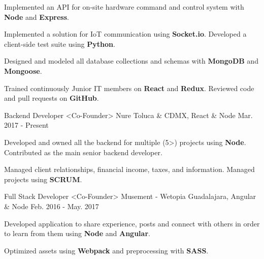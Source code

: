 \begin{cventries}
{\begin{cvitems}
        \item {Implemented an API for on-site hardware command and control system with \textbf{Node} and \textbf{Express}.}
        \item {Implemented a solution for IoT communication using \textbf{Socket.io}. Developed a client-side test suite using \textbf{Python}.}
        \item {Designed and modeled all database collections and schemas with \textbf{MongoDB} and \textbf{Mongoose}.}
        \item {Trained continuously Junior IT members on \textbf{React} and \textbf{Redux}. Reviewed code and pull requests on \textbf{GitHub}.}
      \end{cvitems}
    }
    \cventry
      {Backend Developer <Co-Founder>}
      {Nure}
      {Toluca \& CDMX, React \& Node}
      {Mar. 2017 - Present}
      {
        \begin{cvitems}
          \item {Developed and owned all the backend for multiple (5>) projects using \textbf{Node}. Contributed as the main senior backend developer.}
           \item {Managed client relationships, financial income, taxes, and information. Managed projects using \textbf{SCRUM}.}
        \end{cvitems}
      }
    \cventry
      {Full Stack Developer <Co-Founder>}
      {Musement - Wetopia}
      {Guadalajara, Angular \& Node}
      {Feb. 2016 - May. 2017}
      {
        \begin{cvitems}
          \item {Developed application to share experience, posts and connect with others in order to learn from them using \textbf{Node} and \textbf{Angular}.}
          \item {Optimized assets using \textbf{Webpack} and preprocessing with \textbf{SASS}.}
        \end{cvitems}
      }
  \end{cventries}
